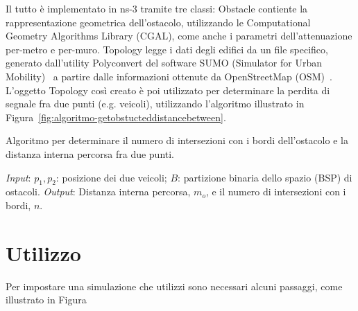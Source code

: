 Il tutto è implementato in ns-3 tramite tre classi: \textsf{Obstacle} contiente la rappresentazione geometrica dell'ostacolo, utilizzando le Computational Geometry Algorithms Library (CGAL),
come anche i parametri dell'attenuazione per-metro e per-muro.
\textsf{Topology} legge i dati degli edifici da un file specifico, generato dall'utility Polyconvert del software SUMO (Simulator for Urban Mobility)~\cite{sumoWebsite}
a partire dalle informazioni ottenute da OpenStreetMap (OSM)~\cite{osmWebsite}.
L'oggetto \textsf{Topology} così creato è poi utilizzato per determinare la perdita di segnale fra due punti (e.g. veicoli), utilizzando l'algoritmo illustrato
in Figura~\ref{fig:algoritmo-getobstucteddistancebetween}.
%
\begin{algorithm}[!h]
\caption{Algoritmo per determinare il numero di intersezioni con i bordi dell'ostacolo e la distanza interna percorsa fra due punti.}\label{fig:algoritmo-getobstucteddistancebetween}
\begin{algorithmic}[1]
	\BState{}\emph{Input}: $p_1, p_2$: posizione dei due veicoli; $B$: partizione binaria dello spazio (BSP) di ostacoli.
	\BState{}\emph{Output}: Distanza interna percorsa, $m_o$, e il numero di intersezioni con i bordi, $n$.
				\EndIf{}
			\EndFor{}
		\EndIf{}
	\EndFor{}
	\EndProcedure{}
\end{algorithmic}
\end{algorithm}
%
\section{Utilizzo}
Per impostare una simulazione che utilizzi sono necessari alcuni passaggi, come illustrato in Figura  
